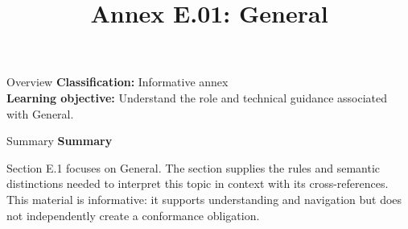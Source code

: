 \documentclass[10pt,letterpaper]{article}
\title{Annex E.01: General}
\author{}
\date{}
\begin{document}
\maketitle
\begin{CornellOverviewBox}{Overview}
\textbf{Classification:} Informative annex\\[2pt]
\textbf{Learning objective:} Understand the role and technical guidance associated with General.
\end{CornellOverviewBox}\begin{CornellSummaryBox}{Summary}
{\sffamily\bfseries\color{Accent} Summary}\par\vspace{3pt}Section E.1 focuses on General. The section supplies the rules and semantic distinctions needed to interpret this topic in context with its cross-references. This material is informative: it supports understanding and navigation but does not independently create a conformance obligation.
\end{CornellSummaryBox}
\end{document}

